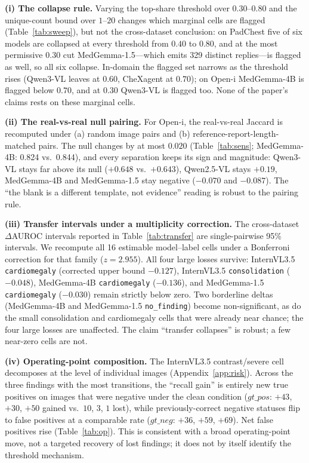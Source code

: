 \textbf{(i) The collapse rule.} Varying the top-share threshold over $0.30$--$0.80$ and the unique-count bound over $1$--$20$ changes which marginal cells are flagged (Table~\ref{tab:sweep}), but not the cross-dataset conclusion: on PadChest five of six models are collapsed at every threshold from $0.40$ to $0.80$, and at the most permissive $0.30$ cut MedGemma-1.5---which emits 329 distinct replies---is flagged as well, so all six collapse. In-domain the flagged set narrows as the threshold rises (Qwen3-VL leaves at $0.60$, CheXagent at $0.70$); on Open-i MedGemma-4B is flagged below $0.70$, and at $0.30$ Qwen3-VL is flagged too. None of the paper's claims rests on these marginal cells.

\textbf{(ii) The real-vs-real null pairing.} For Open-i, the real-vs-real Jaccard is recomputed under (a) random image pairs and (b) reference-report-length-matched pairs. The null changes by at most $0.020$ (Table~\ref{tab:sens}; MedGemma-4B: 0.824 vs.\ 0.844), and every separation keeps its sign and magnitude: Qwen3-VL stays far above its null ($+0.648$ vs.\ $+0.643$), Qwen2.5-VL stays $+0.19$, MedGemma-4B and MedGemma-1.5 stay negative ($-0.070$ and $-0.087$). The ``the blank is a different template, not evidence'' reading is robust to the pairing rule.

\textbf{(iii) Transfer intervals under a multiplicity correction.} The cross-dataset $\Delta$AUROC intervals reported in Table~\ref{tab:transfer} are single-pairwise 95\% intervals. We recompute all 16 estimable model--label cells under a Bonferroni correction for that family ($z=2.955$). All four large losses survive: InternVL3.5 \texttt{cardiomegaly} (corrected upper bound $-0.127$), InternVL3.5 \texttt{consolidation} ($-0.048$), MedGemma-4B \texttt{cardiomegaly} ($-0.136$), and MedGemma-1.5 \texttt{cardiomegaly} ($-0.030$) remain strictly below zero. Two borderline deltas (MedGemma-4B and MedGemma-1.5 \texttt{no\_finding}) become non-significant, as do the small consolidation and cardiomegaly cells that were already near chance; the four large losses are unaffected. The claim ``transfer collapses'' is robust; a few near-zero cells are not.

\textbf{(iv) Operating-point composition.} The InternVL3.5 contrast/severe cell decomposes at the level of individual images (Appendix~\ref{app:risk}). Across the three findings with the most transitions, the ``recall gain'' is entirely new true positives on images that were negative under the clean condition ($gt\_pos$: $+43$, $+30$, $+50$ gained vs.\ $10$, $3$, $1$ lost), while previously-correct negative statuses flip to false positives at a comparable rate ($gt\_neg$: $+36$, $+59$, $+69$). Net false positives rise (Table~\ref{tab:op}). This is consistent with a broad operating-point move, not a targeted recovery of lost findings; it does not by itself identify the threshold mechanism.

